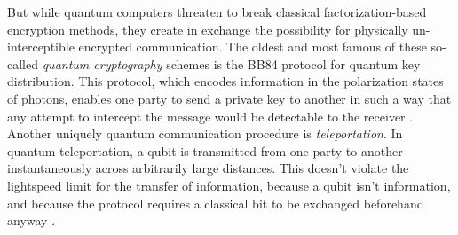 \documentclass[12pt]{report}
\begin{document}
But while quantum computers threaten to break classical factorization-based encryption methods, they create in exchange the possibility for physically un-interceptible encrypted communication. The oldest and most famous of these so-called \emph{quantum cryptography} schemes is the BB84 protocol for quantum key distribution. This protocol, which encodes information in the polarization states of photons, enables one party to send a private key to another in such a way that any attempt to intercept the message would be detectable to the receiver \cite{Bennett2014,Shor2000}. Another uniquely quantum communication procedure is \emph{teleportation}. In quantum teleportation, a qubit is transmitted from one party to another instantaneously across arbitrarily large distances. This doesn't violate the lightspeed limit for the transfer of information, because a qubit isn't information, and because the protocol requires a classical bit to be exchanged beforehand anyway \cite{Bennett1993}. 
\end{document}

